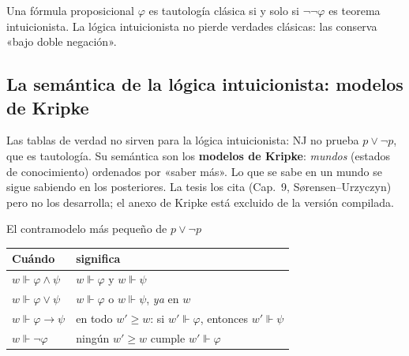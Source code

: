 \documentclass[11pt,a4paper]{article}
\newcommand{\termino}[1]{\textbf{#1}}
\begin{document}
\begin{nota}
Una fórmula proposicional \(\varphi\) es tautología clásica si y solo si
\(\neg\neg\varphi\) es teorema intuicionista. La lógica intuicionista no
pierde verdades clásicas: las conserva «bajo doble negación».
\end{nota}

\subsection{La semántica de la lógica intuicionista: modelos de Kripke}

Las tablas de verdad no sirven para la lógica intuicionista: NJ no prueba
\(p\vee\neg p\), que es tautología. Su semántica son los \termino{modelos de
Kripke}: \emph{mundos} (estados de conocimiento) ordenados por «saber más».
Lo que se sabe en un mundo se sigue sabiendo en los posteriores. La tesis los
cita (Cap.\ 9, Sørensen--Urzyczyn) pero no los desarrolla; el anexo de Kripke
está excluido de la versión compilada.

\begin{figura}{El contramodelo más pequeño de \(p\vee\neg p\)}
\end{figura}

\begin{center}
{\small
\renewcommand{\arraystretch}{1.2}
\begin{tabular}{@{}l@{\qquad}l@{}}
\toprule
\textbf{Cuándo} & \textbf{significa}\\
\midrule
\(w\Vdash\varphi\wedge\psi\) & \(w\Vdash\varphi\) y \(w\Vdash\psi\)\\
\(w\Vdash\varphi\vee\psi\) & \(w\Vdash\varphi\) o \(w\Vdash\psi\), \emph{ya} en \(w\)\\
\(w\Vdash\varphi\to\psi\) & en todo \(w'\geq w\): si \(w'\Vdash\varphi\), entonces \(w'\Vdash\psi\)\\
\(w\Vdash\neg\varphi\) & ningún \(w'\geq w\) cumple \(w'\Vdash\varphi\)\\
\bottomrule
\end{tabular}}
\end{center}
\end{document}
